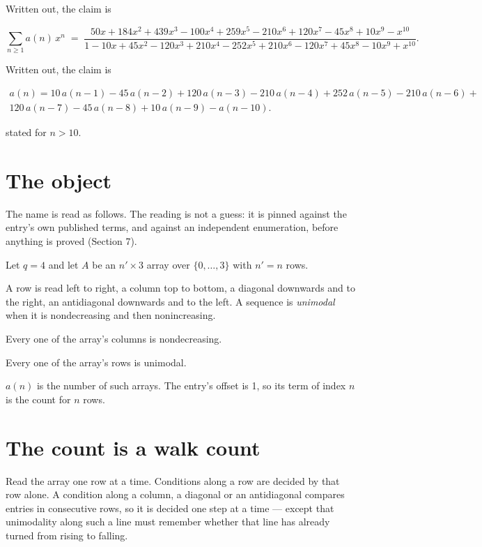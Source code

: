 \documentclass[11pt]{article}
\theoremstyle{definition}
\begin{document}
Written out, the claim is

\[\sum_{n \ge 1} a(n)\,x^n \;=\; \frac{50x + 184x^{2} + 439x^{3} - 100x^{4} + 259x^{5} - 210x^{6} + 120x^{7} - 45x^{8} + 10x^{9} - x^{10}}{1 - 10x + 45x^{2} - 120x^{3} + 210x^{4} - 252x^{5} + 210x^{6} - 120x^{7} + 45x^{8} - 10x^{9} + x^{10}}.\]

Written out, the claim is

\begin{multline*} a(n) = 10\,a(n-1) - 45\,a(n-2) + 120\,a(n-3) - 210\,a(n-4) + 252\,a(n-5) - 210\,a(n-6) + \\ 120\,a(n-7) - 45\,a(n-8) + 10\,a(n-9) - a(n-10). \end{multline*}

stated for $n > 10$.

\section{The object}

The name is read as follows. The reading is not a guess: it is pinned against the entry's own published terms, and against an independent enumeration, before anything is proved (Section 7).

Let $q = 4$ and let $A$ be an $n' \times 3$ array over $\{0,\dots,3\}$ with $n' = n$ rows.

A row is read left to right, a column top to bottom, a diagonal downwards and to the right, an antidiagonal downwards and to the left. A sequence is {\itshape unimodal} when it is nondecreasing and then nonincreasing.

Every one of the array's columns is nondecreasing.

Every one of the array's rows is unimodal.

$a(n)$ is the number of such arrays. The entry's offset is 1, so its term of index $n$ is the count for $n$ rows.

\section{The count is a walk count}

Read the array one row at a time. Conditions along a row are decided by that row alone. A condition along a column, a diagonal or an antidiagonal compares entries in consecutive rows, so it is decided one step at a time --- except that unimodality along such a line must remember whether that line has already turned from rising to falling.
\end{document}
